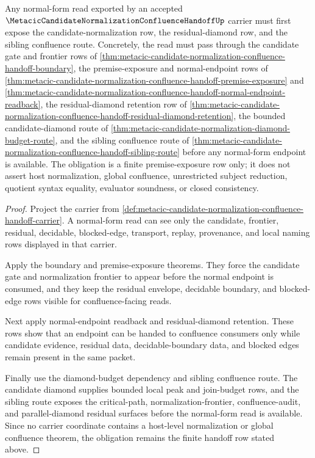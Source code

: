 \begin{theorem}
\label{thm:metacic-candidate-normalization-confluence-handoff-normal-form-obligation}
Any normal-form read exported by an accepted
$\MetacicCandidateNormalizationConfluenceHandoffUp$ carrier must first expose
the candidate-normalization row, the residual-diamond row, and the sibling
confluence route. Concretely, the read must pass through the candidate gate and
frontier rows of
\autoref{thm:metacic-candidate-normalization-confluence-handoff-boundary}, the
premise-exposure and normal-endpoint rows of
\autoref{thm:metacic-candidate-normalization-confluence-handoff-premise-exposure}
and
\autoref{thm:metacic-candidate-normalization-confluence-handoff-normal-endpoint-readback},
the residual-diamond retention row of
\autoref{thm:metacic-candidate-normalization-confluence-handoff-residual-diamond-retention},
the bounded candidate-diamond route of
\autoref{thm:metacic-candidate-normalization-diamond-budget-route}, and the
sibling confluence route of
\autoref{thm:metacic-candidate-normalization-confluence-handoff-sibling-route}
before any normal-form endpoint is available. The obligation is a finite
premise-exposure row only; it does not assert host normalization, global
confluence, unrestricted subject reduction, quotient syntax equality, evaluator
soundness, or closed consistency.
\end{theorem}
\begin{proof}
Project the carrier from
\autoref{def:metacic-candidate-normalization-confluence-handoff-carrier}. A
normal-form read can see only the candidate, frontier, residual, decidable,
blocked-edge, transport, replay, provenance, and local naming rows displayed in
that carrier.

Apply the boundary and premise-exposure theorems. They force the candidate gate
and normalization frontier to appear before the normal endpoint is consumed,
and they keep the residual envelope, decidable boundary, and blocked-edge rows
visible for confluence-facing reads.

Next apply normal-endpoint readback and residual-diamond retention. These rows
show that an endpoint can be handed to confluence consumers only while
candidate evidence, residual data, decidable-boundary data, and blocked edges
remain present in the same packet.

Finally use the diamond-budget dependency and sibling confluence route. The
candidate diamond supplies bounded local peak and join-budget rows, and the
sibling route exposes the critical-path, normalization-frontier,
confluence-audit, and parallel-diamond residual surfaces before the normal-form
read is available. Since no carrier coordinate contains a host-level
normalization or global confluence theorem, the obligation remains the finite
handoff row stated above.
\end{proof}

